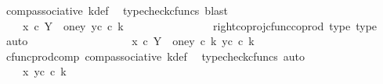 \begin{isabellebody}
\ comp{\isacharunderscore}{\kern0pt}associative{}\ k{\isacharunderscore}{\kern0pt}def\ \isamarkupfalse%
\ {\isacharparenleft}{\kern0pt}typecheck{\isacharunderscore}{\kern0pt}cfuncs{\isacharcomma}{\kern0pt}\ blast{\isacharparenright}{\kern0pt}\isanewline
\ \ \ \ \ \ \ \ \ \ \ \ \isamarkupfalse%
\ \isamarkupfalse%
\ {\isachardoublequoteopen}{\isachardot}{\kern0pt}{\isachardot}{\kern0pt}{\isachardot}{\kern0pt}\ {\isacharequal}{\kern0pt}\ \ {\isasymlangle}x{}\ {\isasymcirc}\isactrlsub c\ {\isasymbeta}\isactrlbsub Y\ {\isasymsetminus}\ {\isacharparenleft}{\kern0pt}one{\isacharcomma}{\kern0pt}y{}{\isacharparenright}{\kern0pt}\isactrlesub {\isacharcomma}{\kern0pt}\ y{}\isactrlsup c{\isasymrangle}\ {\isasymcirc}\isactrlsub c\ k{\isachardoublequoteclose}\isanewline
\ \ \ \ \ \ \ \ \ \ \ \ \ \ \isamarkupfalse%
\ right{\isacharunderscore}{\kern0pt}coproj{\isacharunderscore}{\kern0pt}cfunc{\isacharunderscore}{\kern0pt}coprod\ type{}\ type{}\ \isamarkupfalse%
\ auto\isanewline
\ \ \ \ \ \ \ \ \ \ \ \ \isamarkupfalse%
\ \isamarkupfalse%
\ {\isachardoublequoteopen}{\isachardot}{\kern0pt}{\isachardot}{\kern0pt}{\isachardot}{\kern0pt}\ {\isacharequal}{\kern0pt}\ \ {\isasymlangle}x{}\ {\isasymcirc}\isactrlsub c\ {\isasymbeta}\isactrlbsub Y\ {\isasymsetminus}\ {\isacharparenleft}{\kern0pt}one{\isacharcomma}{\kern0pt}y{}{\isacharparenright}{\kern0pt}\isactrlesub \ {\isasymcirc}\isactrlsub c\ k{\isacharcomma}{\kern0pt}\ y{}\isactrlsup c\ {\isasymcirc}\isactrlsub c\ k\ {\isasymrangle}{\isachardoublequoteclose}\isanewline
\ \ \ \ \ \ \ \ \ \ \ \ \ \ \isamarkupfalse%
\ cfunc{\isacharunderscore}{\kern0pt}prod{\isacharunderscore}{\kern0pt}comp\ comp{\isacharunderscore}{\kern0pt}associative{}\ k{\isacharunderscore}{\kern0pt}def\ \isamarkupfalse%
\ {\isacharparenleft}{\kern0pt}typecheck{\isacharunderscore}{\kern0pt}cfuncs{\isacharcomma}{\kern0pt}\ auto{\isacharparenright}{\kern0pt}\isanewline
\ \ \ \ \ \ \ \ \ \ \ \ \isamarkupfalse%
\ \isamarkupfalse%
\ {\isachardoublequoteopen}{\isachardot}{\kern0pt}{\isachardot}{\kern0pt}{\isachardot}{\kern0pt}\ {\isacharequal}{\kern0pt}\ \ {\isasymlangle}x{}{\isacharcomma}{\kern0pt}\ y{}\isactrlsup c\ {\isasymcirc}\isactrlsub c\ k{\isasymrangle}{\isachardoublequoteclose}\isanewline
\ \ \ \ \ \ \ \ \ \ \ \ \ \ \isamarkupfalse%

\end{isabellebody}
